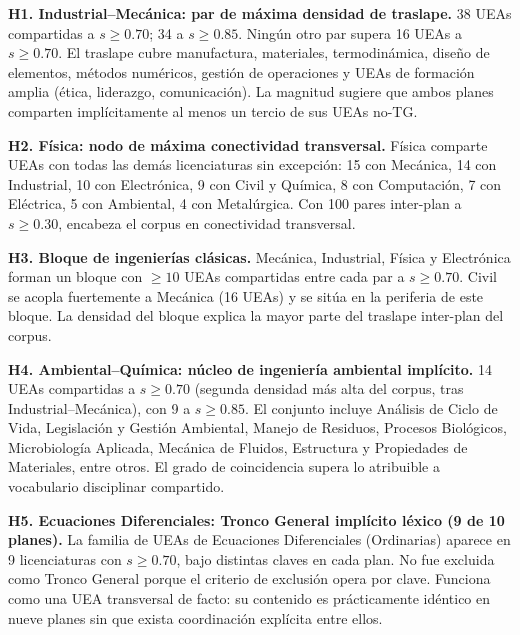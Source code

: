 \documentclass[11pt,a4paper]{article}
\begin{document}
\begin{hallazgo}
\textbf{H1. Industrial--Mecánica: par de máxima densidad de traslape.}
38 UEAs compartidas a $s \geq 0.70$; 34 a $s \geq 0.85$.
Ningún otro par supera 16 UEAs a $s \geq 0.70$.
El traslape cubre manufactura, materiales, termodinámica, diseño de elementos, métodos numéricos, gestión de operaciones y UEAs de formación amplia (ética, liderazgo, comunicación).
La magnitud sugiere que ambos planes comparten implícitamente al menos un tercio de sus UEAs no-TG.
\end{hallazgo}

\begin{hallazgo}
\textbf{H2. Física: nodo de máxima conectividad transversal.}
Física comparte UEAs con todas las demás licenciaturas sin excepción: 15 con Mecánica, 14 con Industrial, 10 con Electrónica, 9 con Civil y Química, 8 con Computación, 7 con Eléctrica, 5 con Ambiental, 4 con Metalúrgica.
Con 100 pares inter-plan a $s \geq 0.30$, encabeza el corpus en conectividad transversal.
\end{hallazgo}

\begin{hallazgo}
\textbf{H3. Bloque de ingenierías clásicas.}
Mecánica, Industrial, Física y Electrónica forman un bloque con $\geq 10$ UEAs compartidas entre cada par a $s \geq 0.70$.
Civil se acopla fuertemente a Mecánica (16 UEAs) y se sitúa en la periferia de este bloque.
La densidad del bloque explica la mayor parte del traslape inter-plan del corpus.
\end{hallazgo}

\begin{hallazgo}
\textbf{H4. Ambiental--Química: núcleo de ingeniería ambiental implícito.}
14 UEAs compartidas a $s \geq 0.70$ (segunda densidad más alta del corpus, tras Industrial--Mecánica), con 9 a $s \geq 0.85$.
El conjunto incluye Análisis de Ciclo de Vida, Legislación y Gestión Ambiental, Manejo de Residuos, Procesos Biológicos, Microbiología Aplicada, Mecánica de Fluidos, Estructura y Propiedades de Materiales, entre otros.
El grado de coincidencia supera lo atribuible a vocabulario disciplinar compartido.
\end{hallazgo}

\begin{hallazgo}
\textbf{H5. Ecuaciones Diferenciales: Tronco General implícito léxico (9 de 10 planes).}
La familia de UEAs de Ecuaciones Diferenciales (Ordinarias) aparece en 9 licenciaturas con $s \geq 0.70$, bajo distintas claves en cada plan.
No fue excluida como Tronco General porque el criterio de exclusión opera por clave.
Funciona como una UEA transversal de facto: su contenido es prácticamente idéntico en nueve planes sin que exista coordinación explícita entre ellos.
\end{hallazgo}
\end{document}
